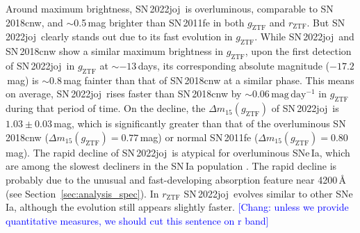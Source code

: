 \documentclass[twocolumn]{aastex631}
\newcommand{\sn}{SN\,2022joj}
\newcommand{\chang}[1]{\textcolor{blue}{[Chang: #1]}}
\begin{document}
\begin{CJK*}{UTF8}{gbsn}
Around maximum brightness, \sn\ is overluminous, comparable to SN\,2018cnw, and $\sim$0.5\,mag brighter than SN\,2011fe in both $g_\mathrm{ZTF}$ and $r_\mathrm{ZTF}$. But \sn\ clearly stands out due to its fast evolution in $g_\mathrm{ZTF}$. While \sn\ and SN\,2018cnw show a similar maximum brightness in $g_\mathrm{ZTF}$, upon the first detection of \sn\ in $g_\mathrm{ZTF}$ at $\sim$$-13$\,days, its corresponding absolute magnitude ($-17.2$\,mag) is $\sim$0.8\,mag fainter than that of SN\,2018cnw at a similar phase. This means on average, \sn\ rises faster than SN\,2018cnw by $\sim$$0.06\,\mathrm{mag\,day^{-1}}$ in $g_\mathrm{ZTF}$ during that period of time. On the decline, the $\Delta m_{15}(g_\mathrm{ZTF})$ of \sn\ is $1.03\pm0.03$\,mag, which is significantly greater than that of the overluminous SN\,2018cnw ($\Delta m_{15}(g_\mathrm{ZTF})=0.77$\,mag) or normal SN\,2011fe ($\Delta m_{15}(g_\mathrm{ZTF})=0.80$\,mag). The rapid decline of \sn\ is atypical for overluminous SNe\,Ia, which are among the slowest decliners in the SN\,Ia population \citep{Phillips_1999, Taubenberger_2017}. The rapid decline is probably due to the unusual and fast-developing absorption feature near 4200\,\r{A} (see Section~\ref{sec:analysis_spec}). In $r_\mathrm{ZTF}$ \sn\ evolves similar to other SNe\,Ia, although the evolution still appears slightly faster. \chang{unless we provide quantitative measures, we should cut this sentence on r band}


\end{CJK*}
\end{document}

